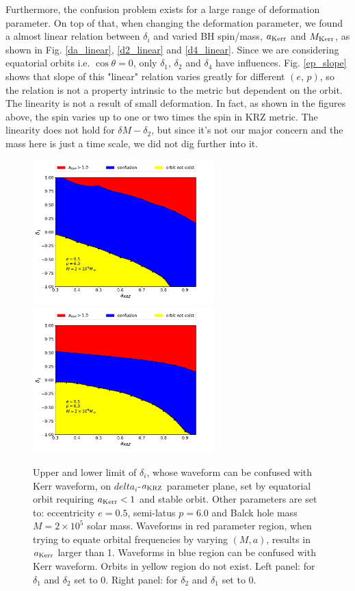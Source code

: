 \documentclass{article}
\begin{document}
Furthermore, the confusion problem exists for a large range of deformation parameter. On top of that, when changing the deformation parameter, we found a almost linear relation between $\delta_i$ and varied BH spin/mass, $a_{\rm{Kerr}}$ and $M_{\rm{Kerr}}$, as shown in Fig. \ref{da_linear}, \ref{d2_linear} and \ref{d4_linear}. Since we are considering equatorial orbits i.e. $\cos\theta=0$, only $\delta_1$, $\delta_2$ and $\delta_4$ have influences. Fig. \ref{ep_slope} shows that slope of this "linear" relation varies greatly for different $(e,\,p)$, so the relation is not a property intrinsic to the metric but dependent on the orbit. The linearity is not a result of small deformation. In fact, as shown in the figures above, the spin varies up to one or two times the spin in KRZ metric. The linearity does not hold for $\delta M-\delta_2$, but since it's not our major concern and the mass here is just a time scale, we did not dig further into it. 

\begin{figure}[!ht]
	\centering
	\includegraphics[width=7cm]{2D_bound.pdf}
	\includegraphics[width=7cm]{2D_bound_d2.pdf}
	
	\caption{Upper and lower limit of $\delta_i$, whose waveform can be confused with Kerr waveform, on $delta_i$-$a_{\rm{KRZ}}$ parameter plane, set by equatorial orbit requiring $a_{\rm{Kerr}}<1$ and stable orbit. Other parameters are set to: eccentricity $e=0.5$, semi-latus $p=6.0$ and Balck hole mass $M=2\times10^5$ solar mass. Waveforms in red parameter region, when trying to equate orbital frequencies by varying $(M,a)$, results in $a_{\rm{Kerr}}$ larger than 1. Waveforms in blue region can be confused with Kerr waveform. Orbits in yellow region do not exist. Left panel: for $\delta_1$ and $\delta_2$ set to 0. Right panel: for $\delta_2$ and $\delta_1$ set to 0. }
	\label{d2limit}
\end{figure}
\end{document}
